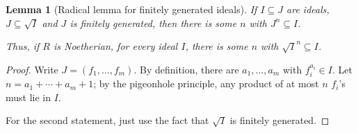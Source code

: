 \documentclass{amsart}[12pt]
\newcommand{\ZZ}{\mathbb{Z}}
\newcommand{\NN}{\mathbb{N}}
\numberwithin{equation}{section}
\theoremstyle{plain} %
\newtheorem{lemma}[equation]{Lemma}
\newtheorem{proposition}[equation]{Proposition}
\theoremstyle{definition}
\theoremstyle{remark}
\begin{document}










\begin{lemma}[Radical lemma for finitely generated ideals]
	If $I \subseteq J$ are ideals, $J\subseteq \sqrt{I}$ and $J$ is finitely generated, then there is some $n$ with $J^n \subseteq I$.
	
	Thus, if $R$ is Noetherian, for every ideal $I$, there is some $n$ with $\sqrt{I}^n \subseteq I$.
\end{lemma}
\begin{proof}
	Write $J=(f_1,\dots,f_m)$. By definition, there are $a_1,\dots,a_m$ with $f_i^{a_i}\in I$. Let \\ ${n=a_1 + \cdots + a_m +1}$; by the pigeonhole principle, any product of at most $n$ $f_i$'s must lie in $I$.
	
	For the second statement, just use the fact that $\sqrt{I}$ is finitely generated.
\end{proof}
\end{document}

